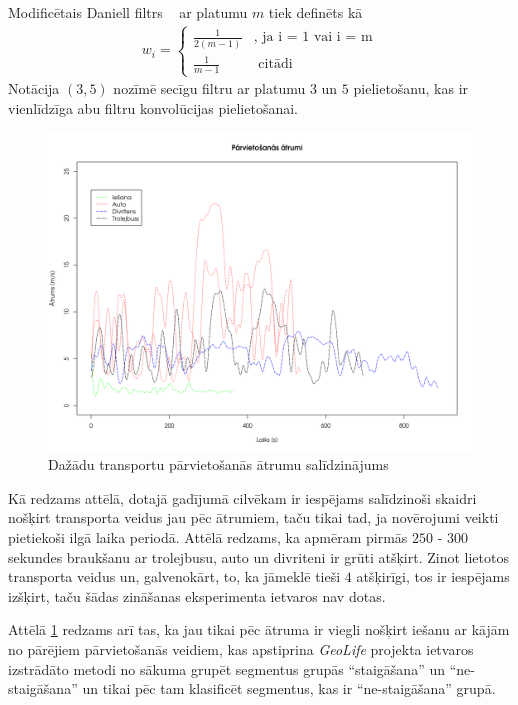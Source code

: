 \documentclass{ludis}
\begin{document}
Modificētais Daniell filtrs ~\cite{daniell1946} ar platumu $m$ tiek definēts kā 
\begin{align*}
  w_i = \begin{cases}
    \frac{1}{2 (m - 1)} &\text{, ja i = 1 vai i = m}\\
    \frac{1}{m - 1} &\text{ citādi}
    \end{cases}
\end{align*}
Notācija $(3, 5)$ nozīmē secīgu filtru ar platumu $3$ un $5$ pielietošanu, kas ir vienlīdzīga
abu filtru konvolūcijas pielietošanai.

\begin{figure}
  \centering
  \includegraphics[scale=0.5]{img/speed_comparison}
  \caption{Dažādu transportu pārvietošanās ātrumu salīdzinājums}
  \label{fig:speed_comparison}
\end{figure}

Kā redzams attēlā, dotajā gadījumā cilvēkam ir iespējams salīdzinoši skaidri nošķirt transporta 
veidus jau pēc ātrumiem, taču tikai tad, ja novērojumi veikti pietiekoši ilgā laika periodā.
Attēlā redzams, ka apmēram pirmās $250$ - $300$ sekundes braukšanu ar trolejbusu, auto un divriteni
ir grūti atšķirt. Zinot lietotos transporta veidus un, galvenokārt, to, ka jāmeklē tieši $4$ 
atšķirīgi, tos ir iespējams izšķirt, taču šādas zināšanas eksperimenta ietvaros nav dotas.

Attēlā \ref{fig:speed_comparison} redzams arī tas, ka jau tikai pēc ātruma ir viegli nošķirt iešanu
ar kājām no pārējiem pārvietošanās veidiem, kas apstiprina \emph{GeoLife} projekta ietvaros
izstrādāto metodi no sākuma grupēt segmentus grupās ``staigāšana'' un ``ne-staigāšana'' un tikai
pēc tam klasificēt segmentus, kas ir ``ne-staigāšana'' grupā. ~\cite{zheng_gps_segmentation}
\end{document}
